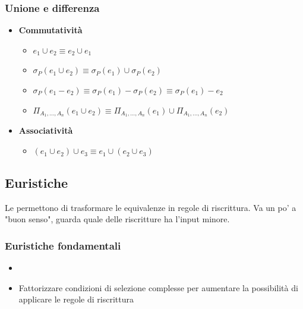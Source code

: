 \documentclass[12pt, a4paper]{report}
\begin{document}
    \subsubsection{Unione e differenza}
    \begin{itemize}
        \item \textbf{Commutatività} \begin{itemize}
            \item $e_{1} \cup e_{2} \equiv e_{2} \cup e_{1}$
            \item $\sigma_{P}(e_{1} \cup e_{2}) \equiv \sigma_{P}(e_{1}) \cup \sigma_{P}(e_{2})$
            \item $\sigma_{P}(e_{1}-e_{2}) \equiv \sigma_{P}(e_{1})-\sigma_{P}(e_{2}) \equiv \sigma_{P}(e_{1})-e_{2}$
            \item $\Pi_{A_{1},\ldots,A_{n}}(e_{1} \cup e_{2})\equiv \Pi_{A_{1},\ldots,A_{n}}(e_{1}) \cup \Pi_{A_{1},\ldots,A_{n}}(e_{2})$
        \end{itemize}
        \item \textbf{Associatività} \begin{itemize}
            \item $(e_{1} \cup e_{2})\cup e_{3} \equiv e_{1} \cup (e_{2} \cup e_{3})$
        \end{itemize}
    \end{itemize}
    \subsection{Euristiche}
    Le  permettono di trasformare le equivalenze in regole di riscrittura. Va un po' a "buon senso", guarda quale delle riscritture ha l'input minore.
    \subsubsection{Euristiche fondamentali}
    \begin{itemize}
        \item {}
        \item Fattorizzare condizioni di selezione complesse per aumentare la possibilità di applicare le regole di riscrittura
    \end{itemize}
\end{document}

